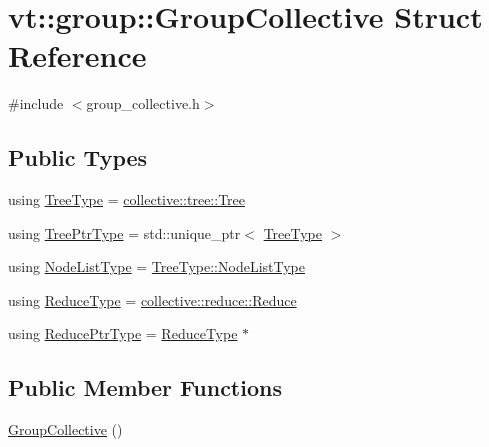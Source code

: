 \hypertarget{structvt_1_1group_1_1_group_collective}{}\section{vt\+:\+:group\+:\+:Group\+Collective Struct Reference}
\label{structvt_1_1group_1_1_group_collective}


{\ttfamily \#include $<$group\+\_\+collective.\+h$>$}

\subsection*{Public Types}
\begin{DoxyCompactItemize}
\item 
using \hyperlink{structvt_1_1group_1_1_group_collective_abae59cc0eb4512145a039fb47fff6a25}{Tree\+Type} = \hyperlink{structvt_1_1collective_1_1tree_1_1_tree}{collective\+::tree\+::\+Tree}
\item 
using \hyperlink{structvt_1_1group_1_1_group_collective_a2e02dc375f193620af9832f187029188}{Tree\+Ptr\+Type} = std\+::unique\+\_\+ptr$<$ \hyperlink{structvt_1_1group_1_1_group_collective_abae59cc0eb4512145a039fb47fff6a25}{Tree\+Type} $>$
\item 
using \hyperlink{structvt_1_1group_1_1_group_collective_a24ad1fd43cf03d5026de910d85c7ac96}{Node\+List\+Type} = \hyperlink{structvt_1_1collective_1_1tree_1_1_tree_a834e7b54ea2dceae42db7c5ea859753f}{Tree\+Type\+::\+Node\+List\+Type}
\item 
using \hyperlink{structvt_1_1group_1_1_group_collective_acc03682a21dc3e4293720c0f6677c88d}{Reduce\+Type} = \hyperlink{structvt_1_1collective_1_1reduce_1_1_reduce}{collective\+::reduce\+::\+Reduce}
\item 
using \hyperlink{structvt_1_1group_1_1_group_collective_a55049a9850a6110ef8ad388a6b2adafc}{Reduce\+Ptr\+Type} = \hyperlink{structvt_1_1group_1_1_group_collective_acc03682a21dc3e4293720c0f6677c88d}{Reduce\+Type} $\ast$
\end{DoxyCompactItemize}
\subsection*{Public Member Functions}
\begin{DoxyCompactItemize}
\item 
\hyperlink{structvt_1_1group_1_1_group_collective_ac4cfd3e8f098c8baeb4fc9898ca5f412}{Group\+Collective} ()
\end{DoxyCompactItemize}

